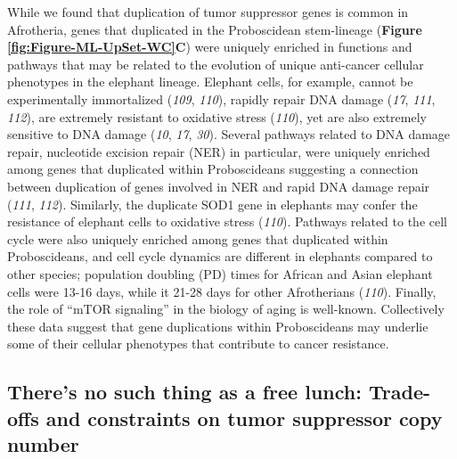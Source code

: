 \documentclass[]{elsarticle} %
\begin{document}
While we found that duplication of tumor suppressor genes is common in Afrotheria, genes that duplicated in the Proboscidean stem-lineage (\textbf{Figure \ref{fig:Figure-ML-UpSet-WC}C}) were uniquely enriched in functions and pathways that may be related to the evolution of unique anti-cancer cellular phenotypes in the elephant lineage. Elephant cells, for example, cannot be experimentally immortalized (\emph{109}, \emph{110}), rapidly repair DNA damage (\emph{17}, \emph{111}, \emph{112}), are extremely resistant to oxidative stress (\emph{110}), yet are also extremely sensitive to DNA damage (\emph{10}, \emph{17}, \emph{30}). Several pathways related to DNA damage repair, nucleotide excision repair (NER) in particular, were uniquely enriched among genes that duplicated within Proboscideans suggesting a connection between duplication of genes involved in NER and rapid DNA damage repair (\emph{111}, \emph{112}). Similarly, the duplicate SOD1 gene in elephants may confer the resistance of elephant cells to oxidative stress (\emph{110}). Pathways related to the cell cycle were also uniquely enriched among genes that duplicated within Proboscideans, and cell cycle dynamics are different in elephants compared to other species; population doubling (PD) times for African and Asian elephant cells were 13-16 days, while it 21-28 days for other Afrotherians (\emph{110}). Finally, the role of ``mTOR signaling'' in the biology of aging is well-known. Collectively these data suggest that gene duplications within Proboscideans may underlie some of their cellular phenotypes that contribute to cancer resistance.

\hypertarget{theres-no-such-thing-as-a-free-lunch-trade-offs-and-constraints-on-tumor-suppressor-copy-number}{%
\subsection{There's no such thing as a free lunch: Trade-offs and constraints on tumor suppressor copy number}\label{theres-no-such-thing-as-a-free-lunch-trade-offs-and-constraints-on-tumor-suppressor-copy-number}}
\end{document}
